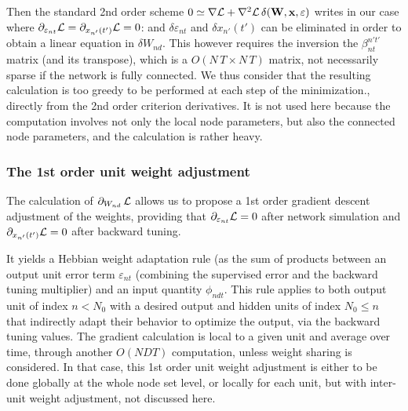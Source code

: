 {Then the standard 2nd order scheme $0 \simeq \nabla {\cal L} + \nabla^2 {\cal L} \, \delta({\bf W}, {\bf x}, {\bf \varepsilon})$ writes in our case where $\partial_{\varepsilon_{nt}} {\cal L} = \partial_{x_{n'}(t')} {\cal L} = 0$:
and $\delta \varepsilon_{nt}$ and $\delta x_{n'}(t')$ can be eliminated in order to obtain a linear equation in $\delta W_{nd}$. This however requires the inversion the $\beta_{nt}^{n't'}$ matrix (and its transpose), which is a $O(N\,T \times N\,T)$ matrix, not necessarily sparse if the network is fully connected. We thus consider that the resulting calculation is too greedy to be performed at each step of the minimization.\hr}, directly from the 2nd order criterion derivatives. It is not used here because the computation involves not only the local node parameters, but also the connected node parameters, and the calculation is rather heavy.

\subsubsection*{The 1st order unit weight adjustment}

The calculation of $\partial_{W_{nd}}\, {\cal L}$ allows us to propose a 1st order gradient descent adjustment of the weights, providing that $\partial_{\varepsilon_{nt}} {\cal L} = 0$ after network simulation and $\partial_{x_{n'}(t')} {\cal L} = 0$ after backward tuning.

It yields a Hebbian weight adaptation rule (as the sum of products between an output unit error term $\varepsilon_{nt}$ (combining the supervised error and the backward tuning multiplier) and an input quantity $\phi_{ndt}$. This rule applies to both output unit of index $n < N_0$ with a desired output and hidden units of index $N_0 \leq n$ that indirectly adapt their behavior to optimize the output, via the backward tuning values. The gradient calculation is local to a given unit and average over time, through another $O(NDT)$ computation, unless weight sharing is considered. In that case, this 1st order unit weight adjustment is either to be done globally at the whole node set level, or locally for each unit, but with inter-unit weight adjustment, not discussed here. 

